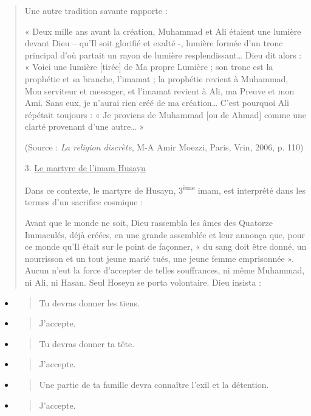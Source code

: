 \begin{quote}
Une autre tradition savante rapporte :

« Deux mille ans avant la création, Muhammad et Ali étaient une lumière
devant Dieu -- qu'Il soit glorifié et exalté -, lumière formée d'un
tronc principal d'où partait un rayon de lumière resplendissant\ldots{}
Dieu dit alors : « Voici une lumière {[}tirée{]} de Ma propre Lumière ;
son tronc est la prophétie et sa branche, l'imamat ; la prophétie
revient à Muhammad, Mon serviteur et messager, et l'imamat revient à
Ali, ma Preuve et mon Ami. Sans eux, je n'aurai rien créé de ma
création\ldots{} C'est pourquoi Ali répétait toujours : « Je proviens de
Muhammad {[}ou de Ahmad{]} comme une clarté provenant d'une
autre\ldots{} »

(Source : \emph{La religion discrète}, M-A Amir Moezzi, Paris, Vrin,
2006, p. 110)

3. \underline{Le martyre de l'imam Husayn}

Dans ce contexte, le martyre de Husayn, 3\textsuperscript{ème} imam, est
interprété dans les termes d'un sacrifice cosmique :

Avant que le monde ne soit, Dieu rassembla les âmes des Quatorze
Immaculés, déjà créées, en une grande assemblée et leur annonça que,
pour ce monde qu'Il était sur le point de façonner, « du sang doit être
donné, un nourrisson et un tout jeune marié tués, une jeune femme
emprisonnée ». Aucun n'eut la force d'accepter de telles souffrances, ni
même Muhammad, ni Ali, ni Hasan. Seul Hoseyn se porta volontaire. Dieu
insista :
\end{quote}

\begin{itemize}
\item
  \begin{quote}
  Tu devras donner les tiens.
  \end{quote}
\item
  \begin{quote}
  J'accepte.
  \end{quote}
\item
  \begin{quote}
  Tu devras donner ta tête.
  \end{quote}
\item
  \begin{quote}
  J'accepte.
  \end{quote}
\item
  \begin{quote}
  Une partie de ta famille devra connaître l'exil et la détention.
  \end{quote}
\item
  \begin{quote}
  J'accepte.
  \end{quote}
\end{itemize}

